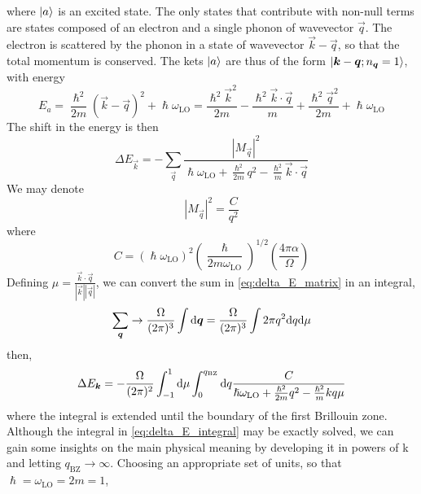 where $\ket{a}$ is an excited state. The only states that contribute with non-null terms are states composed of an electron and a single phonon of wavevector $\vec{q}$. The electron is scattered by the phonon in a state of wavevector $\vec{k} - \vec{q}$, so that the total momentum is conserved. The kets $\ket{a}$ are thus of the form $\ket{\mathbf{\boldsymbol{k}}-\mathbf{\boldsymbol{q}}; n_{\mathbf{\boldsymbol{q}}}=1}$, with energy
\begin{equation}
    E_a = \frac{\hslash^2}{2m}(\vec{k}-\vec{q})^2 + \hslash\omega_\text{LO}
    = \frac{\hslash^2\vec{k}^2}{2m} - \frac{\hslash^2\vec{k}\cdot\vec{q}}{m} + \frac{\hslash^2\vec{q}^2}{2m} + \hslash\omega_\text{LO}
\end{equation}
The shift in the energy is then
\begin{equation} \label{eq:delta_E_matrix}
    \Delta E_\vec{k} = -\sum_\vec{q} \frac{|M_\vec{q}|^2}{\hslash\omega_\text{LO} + \frac{\hslash^2}{2m}q^2 - \frac{\hslash^2}{m}\vec{k}\cdot\vec{q}}
\end{equation}
We may denote
\begin{equation} \label{eq:interaction_matrix_simplified}
    |M_\vec{q}|^2 = \frac{C}{q^2}
\end{equation}
where
\begin{equation} \label{eq:C}
    C = (\hslash \omega_\text{LO})^2 \left(\frac{\hslash}{2m\omega_\text{LO}}\right)^{1/2} \left(\frac{4\pi\alpha}{\Omega}\right)
\end{equation}
Defining $\mu = \frac{\vec{k}\cdot\vec{q}}{|\vec{k}||\vec{q}|}$, we can convert the sum in \cref{eq:delta_E_matrix} in an integral,
\begin{equation}
    \sum_\vec{q} \rightarrow \frac{\Omega}{(2\pi)^3} \int \differential\vec{q} = \frac{\Omega}{(2\pi)^3} \int 2\pi q^2 \differential q \differential \mu
\end{equation}
then,
\begin{equation}\label{eq:delta_E_integral}
    \Delta E_\vec{k} = - \frac{\Omega}{(2\pi)^2} \int_{-1}^1 \differential \mu \int_0^{q_\text{BZ}} \differential q \frac{C}{\hslash\omega_\text{LO} + \frac{\hslash^2}{2m}q^2 - \frac{\hslash^2}{m} kq\mu}
\end{equation}
where the integral is extended until the boundary of the first Brillouin zone. Although the integral in \cref{eq:delta_E_integral} may be exactly solved, we can gain some insights on the main physical meaning by developing it in powers of k and letting $q_\text{BZ} \rightarrow \infty$. Choosing an appropriate set of units, so that $\hslash  = \omega_\text{LO} = 2m = 1$,
